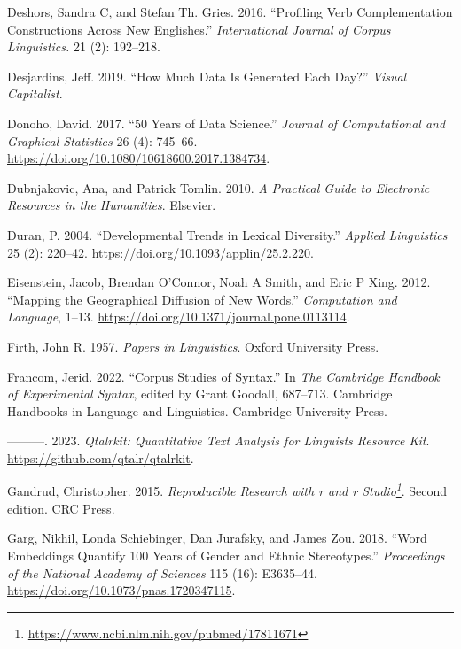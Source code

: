\documentclass[
  letterpaper,
]{latex/krantz}
\newlength{\cslhangindent}
\newenvironment{CSLReferences}[2] %
 {\begin{list}{}{%
  \setlength{\itemindent}{0pt}
  \setlength{\leftmargin}{0pt}
  \setlength{\parsep}{0pt}
  \ifodd #1
   \setlength{\leftmargin}{\cslhangindent}
   \setlength{\itemindent}{-1\cslhangindent}
  \fi
  \setlength{\itemsep}{#2\baselineskip}}}
 {\end{list}}
\theoremstyle{definition}
\theoremstyle{remark}
\DeclareRobustCommand{\href}[2]{#2\footnote{\url{#1}}}
\begin{document}
\begin{CSLReferences}{1}{0}
Deshors, Sandra C, and Stefan Th. Gries. 2016. {``Profiling Verb
Complementation Constructions Across New Englishes.''}
\emph{International Journal of Corpus Linguistics.} 21 (2): 192--218.

Desjardins, Jeff. 2019. {``How Much Data Is Generated Each Day?''}
\emph{Visual Capitalist}.

Donoho, David. 2017. {``50 Years of Data Science.''} \emph{Journal of
Computational and Graphical Statistics} 26 (4): 745--66.
\url{https://doi.org/10.1080/10618600.2017.1384734}.

Dubnjakovic, Ana, and Patrick Tomlin. 2010. \emph{A Practical Guide to
Electronic Resources in the Humanities}. Elsevier.

Duran, P. 2004. {``Developmental Trends in Lexical Diversity.''}
\emph{Applied Linguistics} 25 (2): 220--42.
\url{https://doi.org/10.1093/applin/25.2.220}.

Eisenstein, Jacob, Brendan O'Connor, Noah A Smith, and Eric P Xing.
2012. {``Mapping the Geographical Diffusion of New Words.''}
\emph{Computation and Language}, 1--13.
\url{https://doi.org/10.1371/journal.pone.0113114}.

Firth, John R. 1957. \emph{Papers in Linguistics}. Oxford University
Press.

Francom, Jerid. 2022. {``Corpus Studies of Syntax.''} In \emph{The
Cambridge Handbook of Experimental Syntax}, edited by Grant Goodall,
687--713. Cambridge Handbooks in Language and Linguistics. Cambridge
University Press.

---------. 2023. \emph{Qtalrkit: Quantitative Text Analysis for
Linguists Resource Kit}. \url{https://github.com/qtalr/qtalrkit}.

Gandrud, Christopher. 2015.
\emph{\href{https://www.ncbi.nlm.nih.gov/pubmed/17811671}{Reproducible
Research with r and r Studio}}. Second edition. CRC Press.

Garg, Nikhil, Londa Schiebinger, Dan Jurafsky, and James Zou. 2018.
{``Word Embeddings Quantify 100 Years of Gender and Ethnic
Stereotypes.''} \emph{Proceedings of the National Academy of Sciences}
115 (16): E3635--44. \url{https://doi.org/10.1073/pnas.1720347115}.


\end{CSLReferences}
\end{document}
